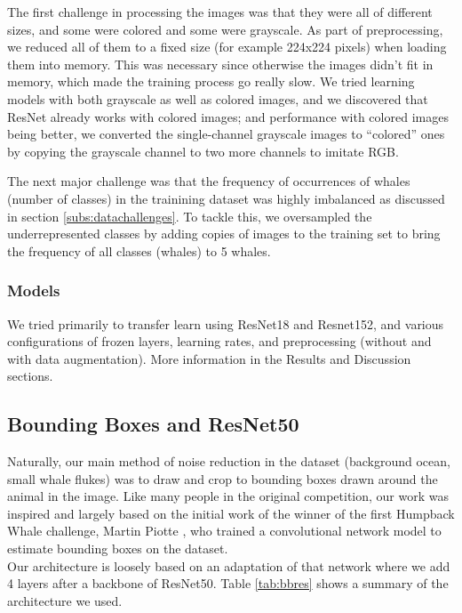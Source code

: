 The first challenge in processing the images was that they were all of different sizes, and some were colored and some were grayscale. As part of preprocessing, we reduced all of them to a fixed size (for example 224x224 pixels) when loading them into memory. This was necessary since otherwise the images didn't fit in memory, which made the training process go really slow. We tried learning models with both grayscale as well as colored images, and we discovered that ResNet already works with colored images; and performance with colored images being better, we converted the single-channel grayscale images to ``colored'' ones by copying the grayscale channel to two more channels to imitate RGB.

The next major challenge was that the frequency of occurrences of whales (number of classes) in the trainining dataset was highly imbalanced as discussed in section \ref{subs:datachallenges}. To tackle this, we oversampled the underrepresented classes by adding copies of images to the training set to bring the frequency of all classes (whales) to 5 whales.

\subsubsection{Models}

We tried primarily to transfer learn using ResNet18 and Resnet152, and various configurations of frozen layers, learning rates, and preprocessing (without and with data augmentation). More information in the Results and Discussion sections.

\subsection{Bounding Boxes and ResNet50}

Naturally, our main method of noise reduction in the dataset (background ocean, small whale flukes) was to draw and crop to bounding boxes drawn around the animal in the image. Like many people in the original competition, our work was inspired and largely based on the initial work of the winner of the first Humpback Whale challenge, Martin Piotte \cite{martin}, who trained a convolutional network model to estimate bounding boxes on the dataset.\\

Our architecture is loosely based on an adaptation of that network where we add 4 layers after a backbone of ResNet50. Table \ref{tab:bbres} shows a summary of the architecture we used. 

